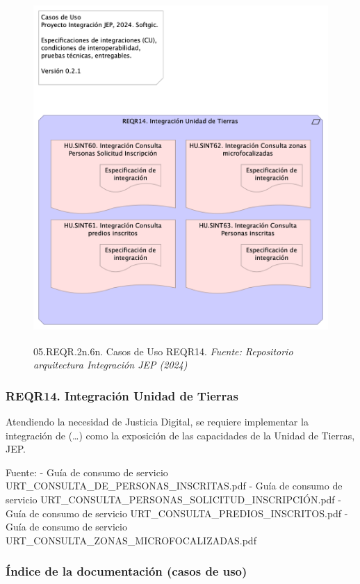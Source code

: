 \documentclass[
  paper=a4,
  ,captions=tableheading
]{scrartcl}
\begin{document}
\begin{figure}
\centering
\includegraphics[width=\textwidth,height=5.20833in]{images/05.REQR.2n.6n.CasosdeUsoREQR14.png}
\caption{05.REQR.2n.6n. Casos de Uso REQR14. \emph{Fuente: Repositorio
arquitectura Integración JEP
(2024)}}\label{fig:id-2b355ee247f540a1abe285299d65fde2}
\end{figure}

\subsubsection{REQR14. Integración Unidad de
Tierras}\label{sec:reqr14.-integraciuxf3n-unidad-de-tierras-1}

Atendiendo la necesidad de Justicia Digital, se requiere implementar la
integración de (\ldots) como la exposición de las capacidades de la
Unidad de Tierras, JEP.

Fuente: - Guía de consumo de servicio
URT\_CONSULTA\_DE\_PERSONAS\_INSCRITAS.pdf - Guía de consumo de servicio
URT\_CONSULTA\_PERSONAS\_SOLICITUD\_INSCRIPCIÓN.pdf - Guía de consumo de
servicio URT\_CONSULTA\_PREDIOS\_INSCRITOS.pdf - Guía de consumo de
servicio URT\_CONSULTA\_ZONAS\_MICROFOCALIZADAS.pdf

\subsubsection{Índice de la documentación (casos de
uso)}\label{sec:uxedndice-de-la-documentaciuxf3n-casos-de-uso-3}
\end{document}
